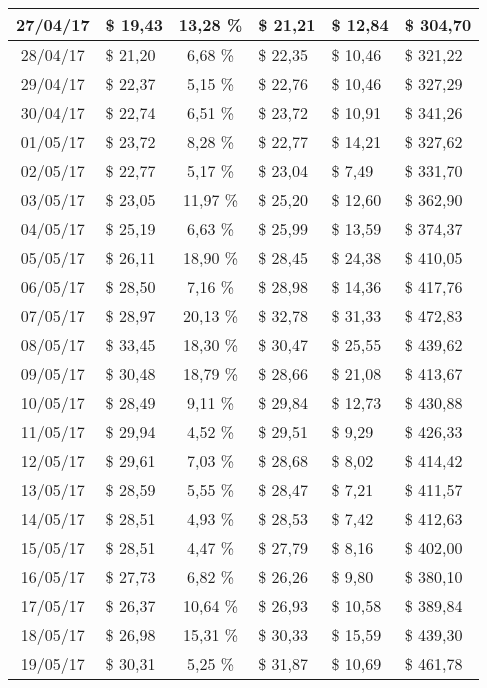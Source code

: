 \begin{center}
\begin{small}
\begin{longtable}{|c|l|c|l|l|l|}
27/04/17 & \$ 19,43 & 13,28 \% & \$ 21,21 & \$ 12,84 & \$ 304,70 \\ \hline
28/04/17 & \$ 21,20 & 6,68 \% & \$ 22,35 & \$ 10,46 & \$ 321,22 \\ \hline
29/04/17 & \$ 22,37 & 5,15 \% & \$ 22,76 & \$ 10,46 & \$ 327,29 \\ \hline
30/04/17 & \$ 22,74 & 6,51 \% & \$ 23,72 & \$ 10,91 & \$ 341,26 \\ \hline
01/05/17 & \$ 23,72 & 8,28 \% & \$ 22,77 & \$ 14,21 & \$ 327,62 \\ \hline
02/05/17 & \$ 22,77 & 5,17 \% & \$ 23,04 & \$ 7,49 & \$ 331,70 \\ \hline
03/05/17 & \$ 23,05 & 11,97 \% & \$ 25,20 & \$ 12,60 & \$ 362,90 \\ \hline
04/05/17 & \$ 25,19 & 6,63 \% & \$ 25,99 & \$ 13,59 & \$ 374,37 \\ \hline
05/05/17 & \$ 26,11 & 18,90 \% & \$ 28,45 & \$ 24,38 & \$ 410,05 \\ \hline
06/05/17 & \$ 28,50 & 7,16 \% & \$ 28,98 & \$ 14,36 & \$ 417,76 \\ \hline
07/05/17 & \$ 28,97 & 20,13 \% & \$ 32,78 & \$ 31,33 & \$ 472,83 \\ \hline
08/05/17 & \$ 33,45 & 18,30 \% & \$ 30,47 & \$ 25,55 & \$ 439,62 \\ \hline
09/05/17 & \$ 30,48 & 18,79 \% & \$ 28,66 & \$ 21,08 & \$ 413,67 \\ \hline
10/05/17 & \$ 28,49 & 9,11 \% & \$ 29,84 & \$ 12,73 & \$ 430,88 \\ \hline
11/05/17 & \$ 29,94 & 4,52 \% & \$ 29,51 & \$ 9,29 & \$ 426,33 \\ \hline
12/05/17 & \$ 29,61 & 7,03 \% & \$ 28,68 & \$ 8,02 & \$ 414,42 \\ \hline
13/05/17 & \$ 28,59 & 5,55 \% & \$ 28,47 & \$ 7,21 & \$ 411,57 \\ \hline
14/05/17 & \$ 28,51 & 4,93 \% & \$ 28,53 & \$ 7,42 & \$ 412,63 \\ \hline
15/05/17 & \$ 28,51 & 4,47 \% & \$ 27,79 & \$ 8,16 & \$ 402,00 \\ \hline
16/05/17 & \$ 27,73 & 6,82 \% & \$ 26,26 & \$ 9,80 & \$ 380,10 \\ \hline
17/05/17 & \$ 26,37 & 10,64 \% & \$ 26,93 & \$ 10,58 & \$ 389,84 \\ \hline
18/05/17 & \$ 26,98 & 15,31 \% & \$ 30,33 & \$ 15,59 & \$ 439,30 \\ \hline
19/05/17 & \$ 30,31 & 5,25 \% & \$ 31,87 & \$ 10,69 & \$ 461,78 \\ \hline

\end{longtable}
\end{small}
\end{center}
